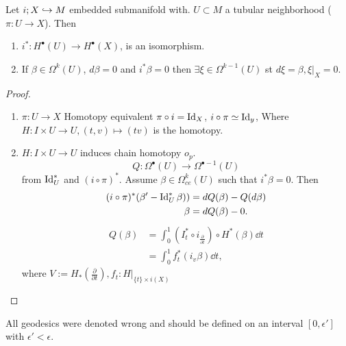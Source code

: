 \begin{proposition}
	Let $i; X \hookrightarrow M$ embedded submanifold with. $U \subset M$ a tubular neighborhood ($\pi: U \to X$).
	Then 
	\begin{enumerate}
		\item $i^*: H^{\bullet}(U) \to H^{\bullet}(X)$, is an isomorphism.
		\item If $\beta \in \Omega^{k}(U)$, $d\beta = 0$ and $i^*\beta  = 0$ then $\exists \xi \in \Omega^{k-1}(U)$ st $d\xi = \beta, \xi|_X = 0$.
	\end{enumerate}
\end{proposition}
\begin{proof}
	\begin{enumerate}
		\item $\pi: U \to X$ Homotopy equivalent $\pi \circ i = \operatorname{Id} _X$, $i\circ \pi \simeq \operatorname{Id}_y$, 
			Where $H:I \times U \to U, (t, v)\mapsto  (tv)$ is the homotopy.
		\item $H: I \times U \to U$ induces chain homotopy $o_p$. \[
				Q: \Omega^{\bullet}(U) \to \Omega^{\bullet -1}(U)
		\]
		from $\operatorname{Id}^*_U$ and $(i\circ \pi)^*$.
		Assume $\beta \in \Omega^{k}_{ce}(U)$ such that $i^*\beta = 0$. 
		Then 
		\begin{align*}
			(i\circ \pi)^*(\beta ' - \operatorname{Id}_U^*\beta)) &=  d Q(\beta) - Q(d\beta) \\
			\beta &=  dQ (\beta) - 0
		.\end{align*}
		\begin{align*}
			Q(\beta) &=  \int_0^{1}\left( I_t^* \circ i_{\frac{\partial }{\partial t} } \right)  \circ H^*(\beta)  \dd t\\
				 &= \int_0^{1} f^*_t(i_v\beta) \dd t 
		,\end{align*}
		where $V := H_*(\frac{\partial }{\partial t} ), f_t: H|_{\{t\} \times i(X)}$

	\end{enumerate}
\end{proof}

\begin{TODO}
	All geodesics were denoted wrong and should be defined on an interval $[0, \epsilon']$ with  $\epsilon'< \epsilon $.
\end{TODO}
